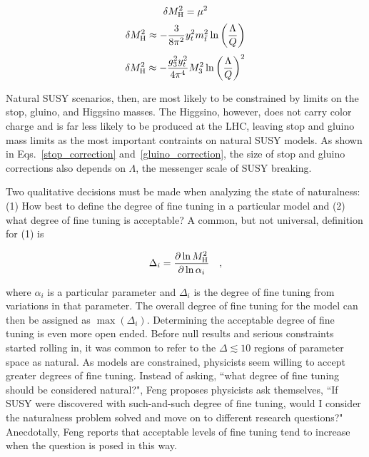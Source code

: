 \documentclass[12pt]{article}
\begin{document}
    \noindent \begin{equation}
        \delta M_{\mathrm{H}}^2 = \mu^2
        \label{higgsino_correction}
    \end{equation}
    \noindent \begin{equation}
        \delta M_{\mathrm{H}}^2 \approx - \frac{3}{8\pi^2} y_t^2 m_{\tilde{t}}^2 \ln{\left(\frac{\Lambda}{Q}\right)}
        \label{stop_correction}
    \end{equation}
    \noindent \begin{equation}
        \delta M_{\mathrm{H}}^2 \approx - \frac{g_3^2 y_t^2}{4\pi^4} M_3^2 \ln{\left(\frac{\Lambda}{Q}\right)}^2
        \label{gluino_correction}
    \end{equation}

    Natural SUSY scenarios, then, are most likely to be constrained by limits on the stop, gluino, and Higgsino masses. The Higgsino, however, does not carry color charge and is far less likely to be produced at the LHC, leaving stop and gluino mass limits as the most important contraints on natural SUSY models. As shown in Eqs.~\ref{stop_correction} and~\ref{gluino_correction}, the size of stop and gluino corrections also depends on $\Lambda$, the messenger scale of SUSY breaking.  

    Two qualitative decisions must be made when analyzing the state of naturalness: (1) How best to define the degree of fine tuning in a particular model and (2) what degree of fine tuning is acceptable? A common, but not universal, definition for (1) is
    
    \noindent \begin{equation}
        \Delta_i = \frac{\partial \ln{M_{\mathrm{H}}^2}}{\partial \ln{\alpha_i}} \quad ,
        \label{fine_tuning}
    \end{equation}

    \noindent where $\alpha_i$ is a particular parameter and $\Delta_i$ is the degree of fine tuning from variations in that parameter. The overall degree of fine tuning for the model can then be assigned as $\max{\left(\Delta_i\right)}$. Determining the acceptable degree of fine tuning is even more open ended. Before null results and serious constraints started rolling in, it was common to refer to the $\Delta \lesssim 10$ regions of parameter space as natural. As models are constrained, physicists seem willing to accept greater degrees of fine tuning. Instead of asking, ``what degree of fine tuning should be considered natural?", Feng proposes physicists ask themselves, ``If SUSY were discovered with such-and-such degree of fine tuning, would I consider the naturalness problem solved and move on to different research questions?" Anecdotally, Feng reports that acceptable levels of fine tuning tend to increase when the question is posed in this way.  
\end{document}
